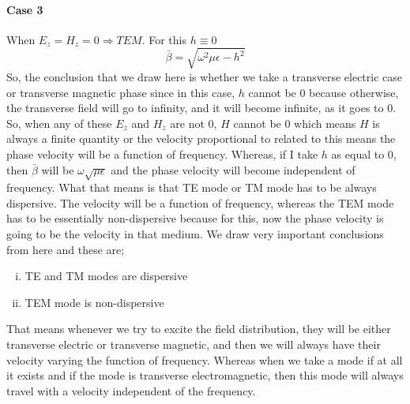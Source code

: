 \paragraph{Case 3}When $E_z = H_z = 0 \Rightarrow TEM$. For this $h \equiv 0$
\begin{dmath*}
\bar{\beta} = \sqrt{\omega^2\mu\epsilon - h^2}
\end{dmath*}
So, the conclusion that we draw here is whether we take a transverse electric case or transverse magnetic phase since in this case, $h$ cannot be 0 because otherwise, the transverse field will go to infinity, and it will become infinite, as it goes to 0. So, when any of these  $E_z$ and $H_z$ are not 0, $H$ cannot be 0 which means $H$ is always a finite quantity or the velocity proportional to related to this means the phase velocity will be a function of frequency. Whereas, if I take $h$ as equal to 0, then $\bar{\beta}$ will be $\omega \sqrt{\mu\epsilon}$ and the phase velocity will become independent of frequency. What that means is that TE mode or TM mode has to be always dispersive. The velocity will be a function of frequency, whereas the TEM mode has to be essentially non-dispersive because for this, now the phase velocity is going to be the velocity in that medium. We draw very important conclusions from here and these are;
\begin{enumerate}[(i)]
\item TE and TM modes are dispersive
\item TEM mode is non-dispersive
\end{enumerate}
That means whenever we try to excite the field distribution, they will be either transverse electric or transverse magnetic, and then we will always have their velocity varying the function of frequency. Whereas when we take a mode if at all it exists and if the mode is transverse electromagnetic, then this mode will always travel with a velocity independent of the frequency.


